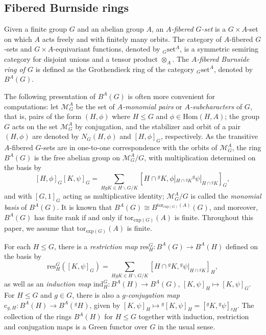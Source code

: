\documentclass[letterpaper,12pt]{article}
\theoremstyle{plain}
\theoremstyle{definition}
\newcommand{\BAG}{B^A(G)}
\newcommand{\BAH}{B^A(H)}
\newcommand{\MAG}{\mathcal{M}^A_G}
\begin{document}
\subsection{Fibered Burnside rings}

Given a finite group $G$ and an abelian group $A$, an \textit{$A$-fibered $G$-set} is a $G\times A$-set on which $A$ acts freely and with finitely many orbits. The category of $A$-fibered $G$-sets and $G\times A$-equivariant functions, denoted by $_G\mathrm{set}^A$, is a symmetric semiring category for disjoint unions and a tensor product $\otimes_A$. The \textit{$A$-fibered Burnside ring of $G$} is defined as the Grothendieck ring of the category $_G\mathrm{set}^A$, denoted by $\BAG$. 

The following presentation of $\BAG$ is often more convenient for computations: let $\MAG$ be the set of \textit{$A$-monomial pairs} or \textit{$A$-subcharacters} of $G$, that is, pairs of the form $(H,\phi)$ where $H\leq G$ and $\phi\in \mathrm{Hom}(H,A)$; the group $G$ acts on the set $\MAG$ by conjugation, and the stabilizer and orbit of a pair $(H,\phi)$ are denoted by $N_G(H,\phi)$ and $[H,\phi]_G$, respectively. As the transitive $A$-fibered $G$-sets are in one-to-one correspondence with the orbits of $\MAG$, the ring $\BAG$ is the free abelian group on $\MAG/G$, with multiplication determined on the basis by
$$[H,\phi]_G[K,\psi]_G=\sum_{HgK\in H\backslash G/K}\left[H\cap {^gK},\phi|_{H\cap {^gK}}{^g\psi}|_{H\cap {^gK}}\right]_G,$$
and with $[G,1]_G$ acting as multiplicative identity; $\MAG/G$ is called the \textit{monomial basis} of $\BAG$. It is known that $B^A(G)\cong B^{\mathrm{tor}_{\mathrm{exp}(G)}(A)}(G)$, and moreover, $\BAG$ has finite rank if and only if $\mathrm{tor}_{\mathrm{exp}(G)}(A)$ is finite. Throughout this paper, we assume that $\mathrm{tor}_{\mathrm{exp}(G)}(A)$ is finite. 

For each $H\leq G$, there is a \textit{restriction map} $\mathrm{res} ^G_H:\BAG\longrightarrow \BAH$ defined on the basis by 
$$\mathrm{res}^G_H\left([K,\psi]_G\right)=\sum_{HgK\in H\backslash G/K}\left[H\cap{^gK},{^g\psi|_{H\cap {^gK}}}\right]_H,$$ 
as well as an \textit{induction map} $\mathrm{ind}^G_H:\BAH\longrightarrow \BAG$, $[K,\psi]_H\mapsto [K,\psi]_G$. For $H\leq G$ and $g\in G$, there is also a \textit{$g$-conjugation map} $\mathrm{c}_{g,H}:\BAH \longrightarrow B^A({^gH})$, given by $[K,\psi]_H\mapsto {^g[K,\psi]_H}=\left[{^gK},{^g\psi}\right]_{^gH}$. The collection of the rings $\BAH$ for $H\leq G$ together with induction, restriction and conjugation maps is a Green functor over $G$ in the usual sense.
\end{document}
